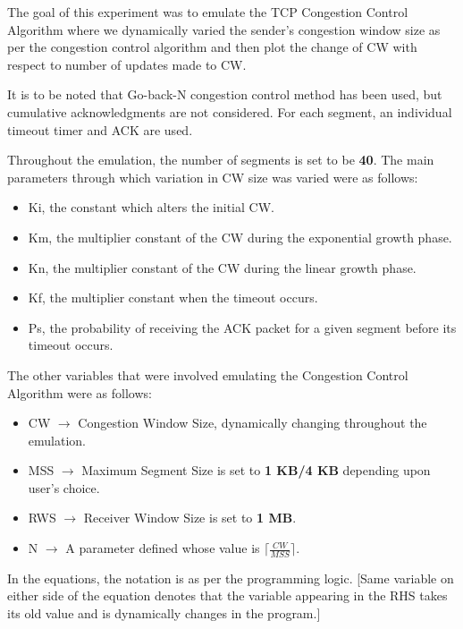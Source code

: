 \documentclass[12pt]{article}
\begin{document}
\maketitle

The goal of this experiment was to emulate the TCP Congestion Control Algorithm where we dynamically varied the sender’s congestion window size as per the congestion control algorithm and then plot the change of CW with respect to number of updates made to CW.

It is to be noted that Go-back-N congestion control method has been used, but cumulative acknowledgments are not considered. For each segment, an individual timeout timer and ACK are used.

Throughout the emulation, the number of segments is set to be \textbf{40}.
The main parameters through which variation in CW size was varied were as follows:
\begin{itemize}
    \item Ki, the constant which alters the initial CW.
    \item Km, the multiplier constant of the CW during the exponential growth phase.
    \item Kn, the multiplier constant of the CW during the linear growth phase.
    \item Kf, the multiplier constant when the timeout occurs.
    \item Ps, the probability of receiving the ACK packet for a given segment before its timeout occurs.
\end{itemize}

The other variables that were involved emulating the Congestion Control Algorithm were as follows:
\begin{itemize}
    \item CW $\rightarrow$ Congestion Window Size, dynamically changing throughout the emulation.
    \item MSS $\rightarrow$ Maximum Segment Size is set to \textbf{1 KB/4 KB} depending upon user's choice.
    \item RWS $\rightarrow$ Receiver Window Size is set to \textbf{1 MB}.
    \item N $\rightarrow$ A parameter defined whose value is $\lceil \frac{CW}{MSS} \rceil$.
\end{itemize}

In the equations, the notation is as per the programming logic. [Same variable on either side of the equation denotes that the variable appearing in the RHS takes its old value and is dynamically changes in the program.]
\end{document}
